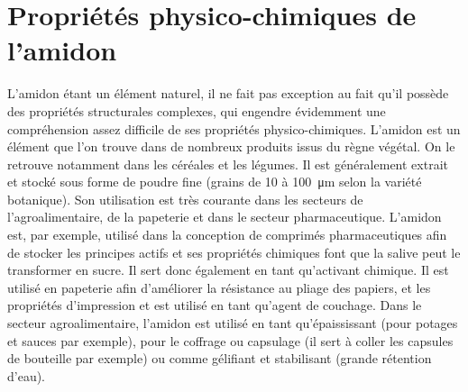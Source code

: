 \graphicspath{{./Annexe_amidon/images/}}

\chapter{Propriétés physico-chimiques de l'amidon}
\label{annexe:amidon}

L'amidon étant un élément naturel, il ne fait pas exception au fait qu'il possède des propriétés structurales complexes, qui engendre évidemment une compréhension assez difficile de ses propriétés physico-chimiques. L'amidon est un élément que l'on trouve dans de nombreux produits issus du règne végétal. On le retrouve notamment dans les céréales et les légumes. Il est généralement extrait et stocké sous forme de poudre fine (grains de 10 à \SI{100}{\micro\meter} selon la variété botanique). Son utilisation est très courante dans les secteurs de l'agroalimentaire, de la papeterie et dans le secteur pharmaceutique. L'amidon est, par exemple, utilisé dans la conception de comprimés pharmaceutiques afin de stocker les principes actifs et ses propriétés chimiques font que la salive peut le transformer en sucre. Il sert donc également en tant qu'activant chimique. Il est utilisé en papeterie afin d'améliorer la résistance au pliage des papiers, et les propriétés d'impression et est utilisé en tant qu'agent de couchage. Dans le secteur agroalimentaire, l'amidon est utilisé en tant qu'épaississant (pour potages et sauces par exemple), pour le coffrage ou capsulage (il sert à coller les capsules de bouteille par exemple) ou comme gélifiant et stabilisant (grande rétention d'eau).
